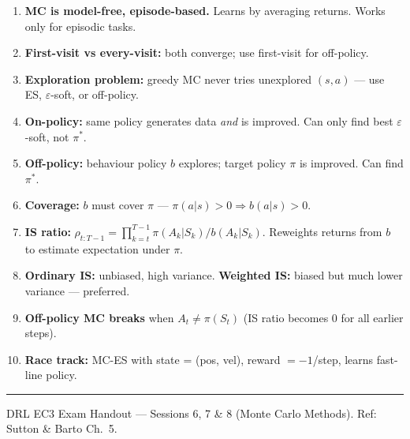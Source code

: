 \documentclass[11pt,a4paper]{article}
\begin{document}
\begin{tcolorbox}[exam={Must Know — MC Methods}]
\begin{enumerate}
  \item \textbf{MC is model-free, episode-based.} Learns by averaging returns. Works only for episodic tasks.
  \item \textbf{First-visit vs every-visit:} both converge; use first-visit for off-policy.
  \item \textbf{Exploration problem:} greedy MC never tries unexplored $(s,a)$ — use ES, $\varepsilon$-soft, or off-policy.
  \item \textbf{On-policy:} same policy generates data \emph{and} is improved. Can only find best $\varepsilon$-soft, not $\pi^*$.
  \item \textbf{Off-policy:} behaviour policy $b$ explores; target policy $\pi$ is improved. Can find $\pi^*$.
  \item \textbf{Coverage:} $b$ must cover $\pi$ — $\pi(a|s)>0 \Rightarrow b(a|s)>0$.
  \item \textbf{IS ratio:} $\rho_{t:T-1} = \prod_{k=t}^{T-1} \pi(A_k|S_k)/b(A_k|S_k)$.
    Reweights returns from $b$ to estimate expectation under $\pi$.
  \item \textbf{Ordinary IS:} unbiased, high variance. \textbf{Weighted IS:} biased but much lower variance — preferred.
  \item \textbf{Off-policy MC breaks} when $A_t \neq \pi(S_t)$ (IS ratio becomes 0 for all earlier steps).
  \item \textbf{Race track:} MC-ES with state = (pos, vel), reward $=-1$/step, learns fast-line policy.
\end{enumerate}
\end{tcolorbox}

\vspace{4pt}
\hrule
\vspace{3pt}
{\footnotesize DRL EC3 Exam Handout — Sessions 6, 7 \& 8 (Monte Carlo Methods). Ref: Sutton \& Barto Ch.~5.}
\end{document}
